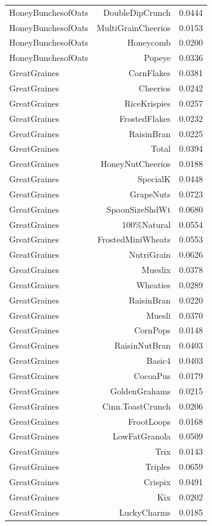 \begin{longtable}{@{}lrr@{}}
HoneyBunchesofOats & DoubleDipCrunch & 0.0444 \\
HoneyBunchesofOats & MultiGrainCheerios & 0.0153 \\
HoneyBunchesofOats & Honeycomb & 0.0200 \\
HoneyBunchesofOats & Popeye & 0.0336 \\
GreatGraines & CornFlakes & 0.0381 \\
GreatGraines & Cheerios & 0.0242 \\
GreatGraines & RiceKrispies & 0.0257 \\
GreatGraines & FrostedFlakes & 0.0232 \\
GreatGraines & RaisinBran & 0.0225 \\
GreatGraines & Total & 0.0394 \\
GreatGraines & HoneyNutCheerios & 0.0188 \\
GreatGraines & SpecialK & 0.0448 \\
GreatGraines & GrapeNuts & 0.0723 \\
GreatGraines & SpoonSizeShdWt & 0.0680 \\
GreatGraines & 100\%Natural & 0.0554 \\
GreatGraines & FrostedMiniWheats & 0.0553 \\
GreatGraines & NutriGrain & 0.0626 \\
GreatGraines & Mueslix & 0.0378 \\
GreatGraines & Wheaties & 0.0289 \\
GreatGraines & RaisinBran & 0.0220 \\
GreatGraines & Muesli & 0.0370 \\
GreatGraines & CornPops & 0.0148 \\
GreatGraines & RaisinNutBran & 0.0403 \\
GreatGraines & Basic4 & 0.0403 \\
GreatGraines & CocoaPus & 0.0179 \\
GreatGraines & GoldenGrahams & 0.0215 \\
GreatGraines & Cinn.ToastCrunch & 0.0206 \\
GreatGraines & FrootLoops & 0.0168 \\
GreatGraines & LowFatGranola & 0.0509 \\
GreatGraines & Trix & 0.0143 \\
GreatGraines & Triples & 0.0659 \\
GreatGraines & Crispix & 0.0491 \\
GreatGraines & Kix & 0.0202 \\
GreatGraines & LuckyCharms & 0.0185 \\

\end{longtable}
